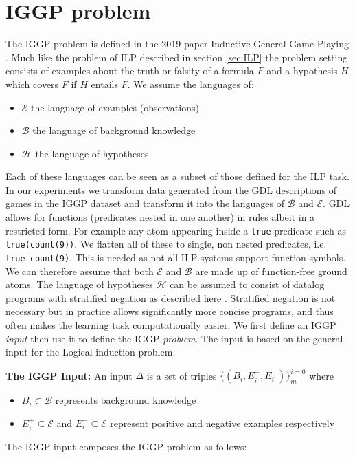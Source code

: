 \chapter{IGGP problem}
\label{ch:IGGP}

The IGGP problem is defined in the 2019 paper Inductive General Game Playing \cite{Cropper/IGGP}. Much like the problem of ILP described in section \ref{sec:ILP} the problem setting consists of examples about the truth or falsity of a formula $F$ and a hypothesis $H$ which covers $F$ if $H$ entails $F$. We assume the languages of:
\begin{itemize}
\item $\mathscr{E}$ the language of examples (observations)
\item $\mathscr{B}$ the language of background knowledge
\item $\mathscr{H}$ the language of hypotheses
\end{itemize}
Each of these languages can be seen as a subset of those defined for the ILP task. In our experiments we transform data generated from the GDL descriptions of games in the IGGP dataset and transform it into the languages of $\mathscr{B}$ and $\mathscr{E}$. GDL allows for functions (predicates nested in one another) in rules albeit in a restricted form. For example any atom appearing inside a \texttt{true} predicate such as \texttt{true(count(9))}. We flatten all of these to single, non nested predicates, i.e. \verb|true_count(9)|. This is needed as not all ILP systems support function symbols. We can therefore assume that both $\mathscr{E}$ and $\mathscr{B}$ are made up of function-free ground atoms. The language of hypotheses $\mathscr{H}$ can be assumed to consist of datalog programs with stratified negation as described here \cite{Kenneth}. Stratified negation is not necessary but in practice allows significantly more concise programs, and thus often makes the learning task computationally easier. We first define an IGGP \textit{input} then use it to define the IGGP \textit{problem}. The input is based on the general input for the Logical induction problem.

\textbf{The IGGP Input:} An input $\Delta$ is a set of triples $\{(B_i,E_i^+,E_i^-)\}_m^{i=0}$ where
\begin{itemize}
\item $B_i \subset \mathscr{B}$ represents background knowledge
\item $E_i^+ \subseteq \mathscr{E}$ and $E_i^- \subseteq \mathscr{E}$ represent positive and negative examples respectively
\end{itemize}
The IGGP input composes the IGGP problem as follows:


